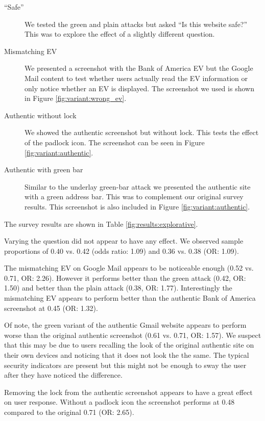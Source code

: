 \documentclass[twoside,letterpaper]{soups}
\begin{document}
\begin{description}

\item[``Safe'']
We tested the green and plain attacks but asked ``Is this website safe?'' This was to explore the effect of a slightly different question.

\item[Mismatching EV]
We presented a screenshot with the Bank of America EV but the Google Mail content to test whether users actually read the EV information or only notice whether an EV is displayed. The screenshot we used is shown in Figure \ref{fig:variant:wrong_ev}.

\item[Authentic without lock]
We showed the authentic screenshot but without lock. This tests the effect of the padlock icon. The screenshot can be seen in Figure \ref{fig:variant:authentic}.

\item[Authentic with green bar]
Similar to the underlay green-bar attack we presented the authentic site with a green address bar. This was to complement our original survey results. This screenshot is also included in Figure \ref{fig:variant:authentic}.

\end{description}

The survey results are shown in Table \ref{fig:results:explorative}.

Varying the question did not appear to have any effect. We observed sample proportions of 0.40 vs. 0.42 (odds ratio: 1.09) and 0.36 vs. 0.38 (OR: 1.09).

The mismatching EV on Google Mail appears to be noticeable enough (0.52 vs. 0.71, OR: 2.26). However it performs better than the green attack (0.42, OR: 1.50) and better than the plain attack (0.38, OR: 1.77). Interestingly the mismatching EV appears to perform better than the authentic Bank of America screenshot at 0.45 (OR: 1.32).

Of note, the green variant of the authentic Gmail website appears to perform worse than the original authentic screenshot (0.61 vs. 0.71, OR: 1.57). We suspect that this may be due to users recalling the look of the original authentic site on their own devices and noticing that it does not look the the same. The typical security indicators are present but this might not be enough to sway the user after they have noticed the difference.

Removing the lock from the authentic screenshot appears to have a great effect on user response. Without a padlock icon the screenshot performs at 0.48 compared to the original 0.71 (OR: 2.65).
\end{document}
